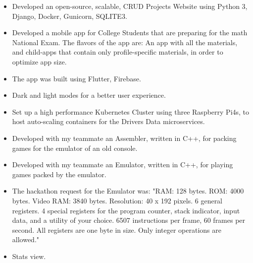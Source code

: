 \documentclass[10pt,a4paper,ragged2e]{resume}
\begin{document}
\begin{fullwidth}
        \begin{itemize}
            \item Developed an open-source, scalable, CRUD Projects Website using Python 3, Django, Docker, Gunicorn, SQLITE3.
            \smallskip
        \end{itemize}
        \divider

        \begin{itemize}
            \item Developed a mobile app for College Students that are preparing for the math National Exam. The flavors of the app are: An app with all the materials, and child-apps that contain only profile-specific materials, in order to optimize app size.
            \item The app was built using Flutter, Firebase.
            \item Dark and light modes for a better user experience.
            \smallskip
        \end{itemize}
        \divider

        \begin{itemize}
            \item Set up a high performance Kubernetes Cluster using three Raspberry Pi4s, to host auto-scaling containers for the Drivers Data microservices.
            \smallskip
        \end{itemize}
        \divider

        \begin{itemize}
            \item Developed with my teammate an Assembler, written in C++, for packing games for the emulator of an old console.
            \smallskip
        \end{itemize}
        \divider

        \begin{itemize}
            \item Developed with my teammate an Emulator, written in C++, for playing games packed by the emulator.
            \item The hackathon request for the Emulator was: "RAM: 128 bytes.
            ROM: 4000 bytes.
            Video RAM: 3840 bytes.
            Resolution: 40 x 192 pixels.
            6 general registers.
            4 special registers for the program counter, stack indicator, input data, and a utility of your choice.
            6507 instructions per frame, 60 frames per second.
            All registers are one byte in size.
            Only integer operations are allowed."
            \item Stats view.
            \smallskip
        \end{itemize}


\end{fullwidth}
\end{document}
